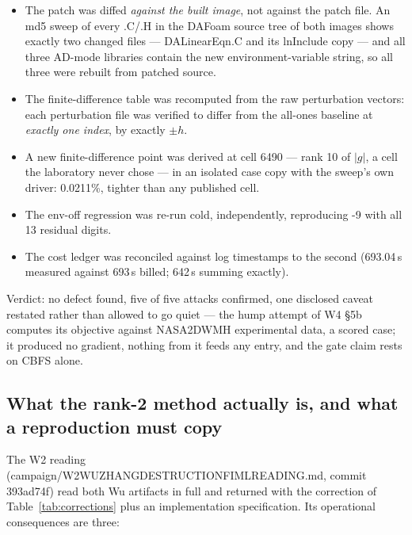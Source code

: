 \documentclass[11pt,a4paper]{article}
\newcommand{\breakus}{\textunderscore\allowbreak}
\newcommand{\code}[1]{{\small\ttfamily\let\_\breakus #1}}
\newcommand{\artifact}[1]{{\footnotesize\ttfamily\let\_\breakus #1}}
\begin{document}
\begin{itemize}
\item The patch was diffed \emph{against the built image}, not against the patch file. An
  md5 sweep of every \code{.C}/\code{.H} in the DAFoam source tree of both images shows
  exactly two changed files --- \code{DALinearEqn.C} and its \code{lnInclude} copy ---
  and all three AD-mode libraries contain the new environment-variable string, so all three
  were rebuilt from patched source.
\item The finite-difference table was recomputed from the raw perturbation vectors: each
  perturbation file was verified to differ from the all-ones baseline at \emph{exactly one
  index}, by exactly $\pm h$.
\item A new finite-difference point was derived at cell 6490 --- rank 10 of $|g|$, a cell
  the laboratory never chose --- in an isolated case copy with the sweep's own driver:
  0.0211\%, tighter than any published cell.
\item The env-off regression was re-run cold, independently, reproducing \code{-9} with all
  13 residual digits.
\item The cost ledger was reconciled against log timestamps to the second (693.04\,s
  measured against 693\,s billed; 642\,s summing exactly).
\end{itemize}

Verdict: no defect found, five of five attacks confirmed, one disclosed caveat restated
rather than allowed to go quiet --- the hump attempt of W4 \S5b computes its objective
against \code{NASA\_2DWMH} experimental data, a scored case; it produced no gradient,
nothing from it feeds any entry, and the gate claim rests on CBFS alone.

\subsection{What the rank-2 method actually is, and what a reproduction must copy}

The W2 reading
(\artifact{campaign/W2\_WU\_ZHANG\_DESTRUCTION\_FIML\_READING.md},
commit \code{393ad74f}) read both Wu artifacts in full and returned with the correction of
Table~\ref{tab:corrections} plus an implementation specification. Its operational
consequences are three:
\end{document}
